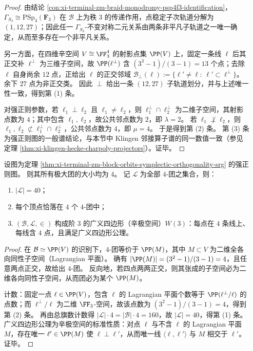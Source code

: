 \begin{proof}
由结论 \ref{con:xi-terminal-zm-braid-monodromy-psp4f3-identification}，\(\Gamma_{S_3}\cong \mathrm{PSp}_4(\mathbf F_3)\) 在 \(\mathcal B\) 上为秩 \(3\) 的传递作用，点稳定子次轨道分解为 \((1,12,27)\)；因此任一 \(\Gamma_{S_3}\)-不变对称二元关系由两条非平凡子轨道之一唯一确定，从而至多存在一个非平凡关系。
\par
另一方面，在四维辛空间 \(V\cong\FF_3^4\) 的射影点集 \(\PP(V)\) 上，固定一条线 \(\ell\) 后其正交补 \(\ell^\perp\) 为三维子空间，故 \(\PP(\ell^\perp)\) 含
\(
(3^3-1)/(3-1)=13
\)
个点；去除 \(\ell\) 自身尚余 \(12\) 点，正给出 \(\ell\) 的正交邻域
\(
\mathcal B_\perp(\ell):=\{\ell'\neq\ell:\ \ell'\subset\ell^\perp\}
\)。
余下 \(27\) 点为非正交类。
因此 \(\perp\) 给出一条 \((12,27)\) 子轨道划分，并与上述唯一性一致，得到第 (1) 条。
\par
对强正则参数，若 \(\ell_1\perp\ell_2\) 且 \(\ell_1\neq\ell_2\)，则 \(\ell_1^\perp\cap \ell_2^\perp\) 为二维子空间，其射影点数为 \(4\)；其中包含 \(\ell_1,\ell_2\)，故公共邻点数为 \(2\)，即 \(\lambda=2\)。
若 \(\ell_1\not\perp\ell_2\)，则 \(\ell_1,\ell_2\not\subset \ell_1^\perp\cap\ell_2^\perp\)，公共邻点数为 \(4\)，即 \(\mu=4\)。
于是得到第 (2) 条。
第 (3) 条为强正则图的一般谱结论，与本节中 Klingen 邻接算子谱的同一数值一致（参见定理 \ref{thm:xi-klingen-hecke-charpoly-projectors}）。证毕。
\end{proof}

\begin{proposition}\label{prop:xi-terminal-zm-reconstruct-W3-from-srg}
设图为定理 \ref{thm:xi-terminal-zm-block-orbits-symplectic-orthogonality-srg} 的强正则图。
则其所有极大团的大小均为 \(4\)。
记 \(\mathcal L\) 为全部 \(4\)-团之集合，则：
\begin{enumerate}
  \item \(|\mathcal L|=40\)；
  \item 每个顶点恰落在 \(4\) 个 \(4\)-团中；
  \item \((\mathcal B,\mathcal L,\in)\) 构成阶 \(3\) 的广义四边形（辛极空间）\(W(3)\)：每点在 \(4\) 条线上、每线含 \(4\) 点，且满足广义四边形公理。
\end{enumerate}
\end{proposition}

\begin{proof}
在 \(\mathcal B\simeq \PP(V)\) 的识别下，\(4\)-团等价于 \(\PP(M)\)，其中 \(M\subset V\) 为二维全各向同性子空间（Lagrangian 平面）。
确有 \(|\PP(M)|=(3^2-1)/(3-1)=4\)，且任意两点正交，故给出 \(4\)-团。
反向地，若四点两两正交，则其张成的子空间必为二维各向同性子空间，从而团必为某个 \(\PP(M)\)。
\par
计数：固定一点 \(\ell\in\PP(V)\)，包含 \(\ell\) 的 Lagrangian 平面个数等于 \(\PP(\ell^\perp/\ell)\) 的点数；而 \(\ell^\perp/\ell\) 为二维 \(\FF_3\)-空间，故该点数为 \((3^2-1)/(3-1)=4\)，得到第 (2) 条。
再由总旗数计数得 \(|\mathcal L|\cdot 4=|\mathcal B|\cdot 4=160\)，故 \(|\mathcal L|=40\)，得第 (1) 条。
广义四边形公理为辛极空间的标准性质：对点 \(\ell\) 与不含 \(\ell\) 的 Lagrangian 平面 \(M\)，存在唯一 \(\ell'\in\PP(M)\) 使 \(\ell\perp\ell'\)，从而唯一线 \(\langle \ell,\ell'\rangle\) 与 \(M\) 相交于 \(\ell'\)。证毕。
\end{proof}

